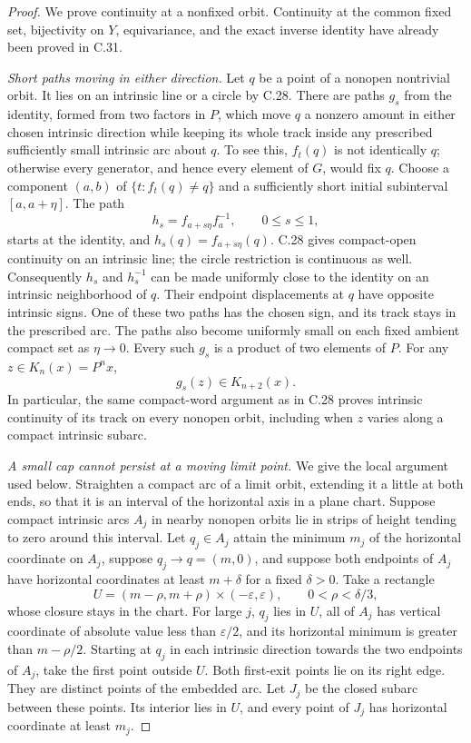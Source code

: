 \begin{proof}
We prove continuity at a nonfixed orbit. Continuity at
the common fixed set, bijectivity on $Y$, equivariance,
and the exact inverse identity have already been proved
in C.31.

\emph{Short paths moving in either direction.}
Let $q$ be a point of a nonopen nontrivial orbit. It lies
on an intrinsic line or a circle by C.28. There are
paths $g_s$ from the identity, formed from two factors
in $P$, which move $q$ a nonzero amount in either
chosen intrinsic direction while keeping its whole
track inside any prescribed sufficiently small
intrinsic arc about $q$.
To see this, $f_t(q)$ is not identically $q$; otherwise
every generator, and hence every element of $G$, would
fix $q$. Choose a component $(a,b)$ of
$\{t:f_t(q)\ne q\}$ and a sufficiently short initial
subinterval $[a,a+\eta]$. The path
\[
          h_s=f_{a+s\eta}f_a^{-1},\qquad 0\leq s\leq1,
                                                        \tag{C.34.2}
\]
starts at the identity, and $h_s(q)=f_{a+s\eta}(q)$.
C.28 gives compact-open continuity on an intrinsic
line; the circle restriction is continuous as well.
Consequently $h_s$ and $h_s^{-1}$ can be made uniformly
close to the identity on an intrinsic neighborhood of
$q$. Their endpoint displacements at $q$ have opposite
intrinsic signs. One of these two paths has the chosen
sign, and its track stays in the prescribed arc.
The paths also become uniformly small on each fixed
ambient compact set as $\eta\to0$.
Every such $g_s$ is a product of two elements of $P$.
For any $z\in K_n(x)=P^nx$,
\[
                        g_s(z)\in K_{n+2}(x).
                                                        \tag{C.34.3}
\]
In particular, the same compact-word argument as in
C.28 proves intrinsic continuity of its track on
every nonopen orbit, including when $z$ varies along
a compact intrinsic subarc.

\emph{A small cap cannot persist at a moving limit point.}
We give the local argument used below. Straighten a
compact arc of a limit orbit, extending it a little
at both ends, so that it is an interval of the
horizontal axis in a plane chart. Suppose compact
intrinsic arcs $A_j$ in nearby nonopen orbits lie in
strips of height tending to zero around this interval.
Let $q_j\in A_j$ attain the minimum $m_j$ of the
horizontal coordinate on $A_j$, suppose
$q_j\to q=(m,0)$, and suppose both endpoints of
$A_j$ have horizontal coordinates at least $m+\delta$
for a fixed $\delta>0$.
Take a rectangle
\[
          U=(m-\rho,m+\rho)\times(-\varepsilon,\varepsilon),
          \qquad 0<\rho<\delta/3,
                                                        \tag{C.34.4}
\]
whose closure stays in the chart. For large $j$,
$q_j$ lies in $U$, all of $A_j$ has vertical coordinate
of absolute value less than $\varepsilon/2$, and its
horizontal minimum is greater than $m-\rho/2$.
Starting at $q_j$ in each intrinsic direction towards
the two endpoints of $A_j$, take the first point
outside $U$. Both first-exit points lie on its right
edge. They are distinct points of the embedded arc.
Let $J_j$ be the closed subarc between these points.
Its interior lies in $U$, and every point of $J_j$
has horizontal coordinate at least $m_j$.


\end{proof}
